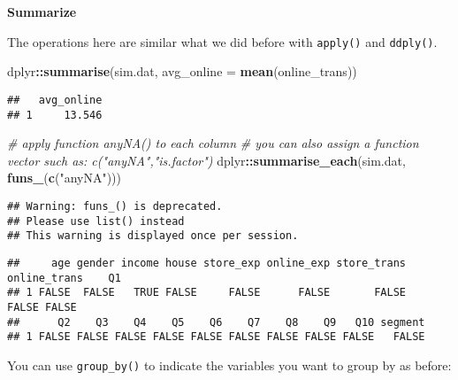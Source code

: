 \documentclass[
]{article}
\newenvironment{Shaded}{\begin{snugshade}}{\end{snugshade}}
\newcommand{\CommentTok}[1]{\textcolor[rgb]{0.56,0.35,0.01}{\textit{#1}}}
\newcommand{\DataTypeTok}[1]{\textcolor[rgb]{0.13,0.29,0.53}{#1}}
\newcommand{\KeywordTok}[1]{\textcolor[rgb]{0.13,0.29,0.53}{\textbf{#1}}}
\newcommand{\NormalTok}[1]{#1}
\newcommand{\OperatorTok}[1]{\textcolor[rgb]{0.81,0.36,0.00}{\textbf{#1}}}
\newcommand{\StringTok}[1]{\textcolor[rgb]{0.31,0.60,0.02}{#1}}
\begin{document}
\textbf{Summarize}

The operations here are similar what we did before with \texttt{apply()}
and \texttt{ddply()}.

\begin{Shaded}
\begin{Highlighting}[]
\NormalTok{dplyr}\OperatorTok{::}\KeywordTok{summarise}\NormalTok{(sim.dat, }\DataTypeTok{avg_online =} \KeywordTok{mean}\NormalTok{(online_trans)) }
\end{Highlighting}
\end{Shaded}

\begin{verbatim}
##   avg_online
## 1     13.546
\end{verbatim}

\begin{Shaded}
\begin{Highlighting}[]
\CommentTok{# apply function anyNA() to each column}
\CommentTok{# you can also assign a function vector such as: c("anyNA","is.factor")}
\NormalTok{dplyr}\OperatorTok{::}\KeywordTok{summarise_each}\NormalTok{(sim.dat, }\KeywordTok{funs_}\NormalTok{(}\KeywordTok{c}\NormalTok{(}\StringTok{"anyNA"}\NormalTok{)))}
\end{Highlighting}
\end{Shaded}

\begin{verbatim}
## Warning: funs_() is deprecated. 
## Please use list() instead
## This warning is displayed once per session.
\end{verbatim}

\begin{verbatim}
##     age gender income house store_exp online_exp store_trans online_trans    Q1
## 1 FALSE  FALSE   TRUE FALSE     FALSE      FALSE       FALSE        FALSE FALSE
##      Q2    Q3    Q4    Q5    Q6    Q7    Q8    Q9   Q10 segment
## 1 FALSE FALSE FALSE FALSE FALSE FALSE FALSE FALSE FALSE   FALSE
\end{verbatim}

You can use \texttt{group\_by()} to indicate the variables you want to
group by as before:

\begin{Shaded}
\end{Shaded}
\end{document}
